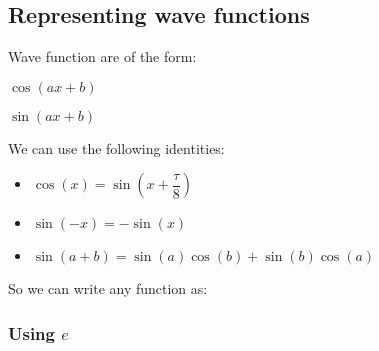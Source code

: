 
\subsection{Representing wave functions}

Wave function are of the form:

\(\cos(ax + b)\)

\(\sin(ax + b)\)

We can use the following identities:

\begin{itemize}
\item \(\cos(x)=\sin(x+\dfrac{\tau }{8})\)
\item \(\sin(-x)=-\sin(x)\)
\item \(\sin(a+b)=\sin(a)\cos(b)+\sin(b)\cos(a)\)
\end{itemize}

So we can write any function as:

\subsubsection{Using \(e\)}


